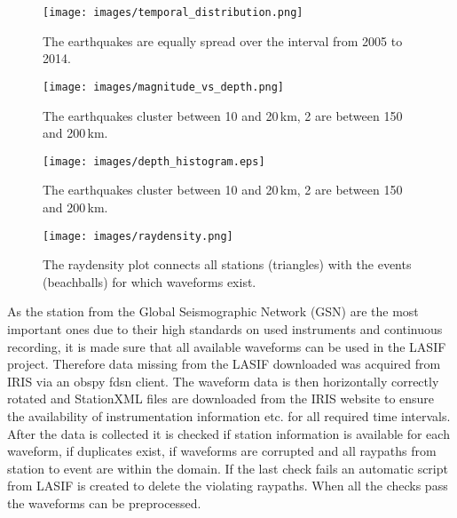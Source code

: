 \begin{figure}[H]
\begin{center}
\texttt{[image: images/temporal\_distribution.png]}
\caption{The earthquakes are equally spread over the interval from 2005 to 2014.}
\label{temp_dist}
\end{center}
\end{figure}

\begin{figure}[H]
\begin{center}
\texttt{[image: images/magnitude\_vs\_depth.png]}
\caption{The earthquakes cluster between 10 and 20\,km, 2 are between 150 and 200\,km.}
\label{depth_scatter}
\end{center}
\end{figure}

\begin{figure}[H]
\begin{center}
\texttt{[image: images/depth\_histogram.eps]}
\caption{The earthquakes cluster between 10 and 20\,km, 2 are between 150 and 200\,km.}
\label{depth_dist}
\end{center}
\end{figure}

\begin{figure}[H]
\begin{center}
\texttt{[image: images/raydensity.png]}
\caption{The raydensity plot connects all stations (triangles) with the events (beachballs) for which waveforms exist.}
\label{raydens}
\end{center}
\end{figure}

As the station from the Global Seismographic Network (GSN) are the most important ones due to their high standards on used 
instruments and continuous recording, it is made sure that all available waveforms can be used in the LASIF project. 
Therefore data missing from the LASIF downloaded was acquired from IRIS via an obspy fdsn client. 
The waveform data is then horizontally correctly rotated and StationXML files are downloaded from the IRIS website to
ensure the availability of instrumentation information etc. for all required time intervals. \\

After the data is collected it is checked if station information is available for each waveform, if duplicates exist, if 
waveforms are corrupted and all raypaths from station to event are within the domain. 
If the last check fails an automatic script from LASIF is created to delete the violating raypaths. 
When all the checks pass the waveforms can be preprocessed. 



